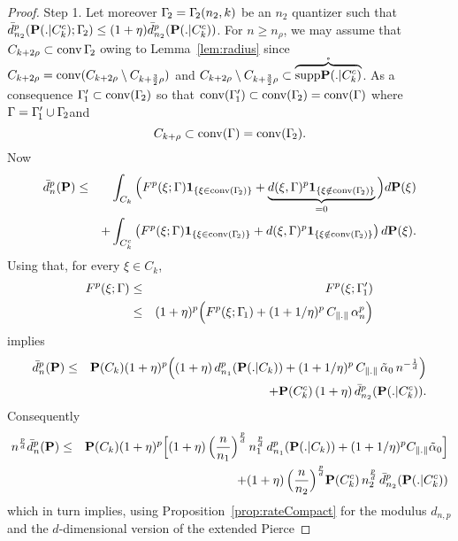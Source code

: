 \begin{proof} {\sc Step 1.}
Let moreover $\Gamma_{\!2}=\Gamma_{\!2}(n_2,k)$ be an $n_2$ quantizer such that
$\bar d^p_{n_2}(\mathbf{P}(.|C_k^c); \Gamma_{\!2}) \leq (1+\eta)
\bar d^p_{n_2}(\mathbf{P}(.|C_k^c))$. 
For $n\ge n_{\rho}$, we may assume that
$C_{k+2\rho}\subset \operatorname{conv}{\Gamma_{\!2}}$ owing to Lemma~\ref{lem:radius} since
$C_{k+2\rho} =\operatorname{conv}(C_{k+2\rho}\setminus C_{k+\frac 32\rho})$ and
$C_{k+2\rho}\setminus C_{k+\frac 32\rho}\subset \mathring{\overbrace{{\rm supp}
\mathbf{P}(.|C_k^c)}}$.
As a consequence $\Gamma_{\!1}'\subset \operatorname{conv}(\Gamma_{\!2})$ so that
$\operatorname{conv}(\Gamma_{\!1}')\subset \operatorname{conv} (\Gamma_{\!2})=\operatorname{conv}(\Gamma)$ where
$\Gamma=\Gamma_{\!1}'\cup \Gamma_{\!2}$and \[ C_{k+\rho}\subset
\operatorname{conv}(\Gamma)=\operatorname{conv}(\Gamma_{\!2}). 
\] 
Now
\begin{eqnarray*}
\bar d_{n}^p(\mathbf{P}) & \le & \int_{C_k}\Big(F^p(\xi;\Gamma)\mbox{\bf
1}_{\{\xi \in \operatorname{conv} (\Gamma_{\!2})\}}+ \underbrace{ d(\xi,\Gamma)^p\mbox{\bf
1}_{\{\xi \notin \operatorname{conv} (\Gamma_{\!2})\}} }_{=0}\Big) d\mathbf{P}(\xi)\\ &&+
\int_{C^c_k}\left(F^p(\xi;\Gamma)\mbox{\bf 1}_{\{\xi \in \operatorname{conv} (\Gamma_{\!2})\}}+
d(\xi,\Gamma)^p \mbox{\bf 1}_{\{\xi \notin \operatorname{conv}
(\Gamma_{\!2})\}}\right)d\mathbf{P}(\xi).
\end{eqnarray*}
%
Using that, for every $\xi\!\in C_k$, 
\begin{eqnarray*}
F^p(\xi;\Gamma) &\le& F^p(\xi;\Gamma_{\!1}')\\
&\le& (1+\eta)^p\Big(F^p(\xi;\Gamma_{\!1})+
(1+1/\eta)^p\,C_{\lVert.\rVert}\,\alpha_n^p\Big)
\end{eqnarray*}
implies
\begin{eqnarray*}
\bar d_{n}^p(\mathbf{P}) & \le & \mathbf{P}(C_k) (1+\eta)^p\Big(
(1+\eta)\,d^p_{n_1}(\mathbf{P}(.|C_k)) + (1+1/\eta)^p\,C_{\lVert.\rVert}\,\tilde
\alpha_0 \,n^{-\frac 1d} \Big)\\
 && + \mathbf{P}(C^c_k)\,(1+\eta)\, \bar d^p_{n_2}(\mathbf{P}(.|C^c_k)).
 \end{eqnarray*}
 Consequently
 \begin{eqnarray*}
n^{\frac pd} \bar d_{n}^p(\mathbf{P}) & \le & \mathbf{P}(C_k)
(1+\eta)^p\Big[(1+\eta)\, \Big(\frac{n}{n_1}\Big)^{\frac pd}\,n_1^{\frac
pd}\,d^p_{n_1}(\mathbf{P}(.|C_k)) 
+ (1+1/\eta)^pC_{\lVert.\rVert}\tilde \alpha_0 \Big]\\ 
 && + (1+\eta)\,
\Big(\frac{n}{n_2}\Big)^{\frac pd}\mathbf{P}(C^c_k)\, n_2^{\frac pd}\,\bar
d_{n_2}^p(\mathbf{P}(.|C^c_k))
 \end{eqnarray*}
 which in turn implies, using Proposition~\ref{prop:rateCompact} for the modulus $d_{n,p}$ and the $d$-dimensional version of the extended Pierce

\end{proof}
